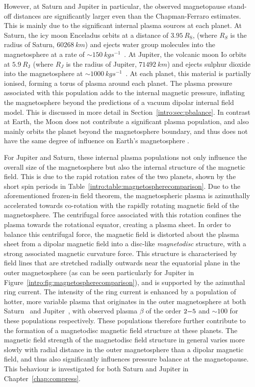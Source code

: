However, at Saturn and Jupiter in particular, the observed magnetopause stand-off distances are significantly larger even than the Chapman-Ferraro estimates. This is mainly due to the significant internal plasma sources at each planet. At Saturn, the icy moon Enceladus orbits at a distance of $\SI{3.95}{R_\mathrm{S}}$, (where $\si{R_S}$ is the radius of Saturn, $\SI{60268}{km}$) and ejects water group molecules into the magnetosphere at a rate of ${\sim}\SI{150}{kg s^{-1}}$~\citep{tokar2006,dougherty2006}. At Jupiter, the volcanic moon Io orbits at $\SI{5.9}{R_\mathrm{J}}$ (where $\si{R_J}$ is the radius of Jupiter, $\SI{71492}{km}$) and ejects sulphur dioxide into the magnetosphere at ${\sim}\SI{1000}{kg s^{-1}}$~\citep{bagenal2011}. At each planet, this material is partially ionised, forming a torus of plasma around each planet. The plasma pressure associated with this population adds to the internal magnetic pressure, inflating the magnetosphere beyond the predictions of a vacuum dipolar internal field model. This is discussed in more detail in Section~\ref{intro:sec:pbalance}. In contrast at Earth, the Moon does not contribute a significant plasma population, and also mainly orbits the planet beyond the magnetosphere boundary, and thus does not have the same degree of influence on Earth's magnetosphere \citep[e.g.][]{schneider1967}.

For Jupiter and Saturn, these internal plasma populations not only influence the overall size of the magnetosphere but also the internal structure of the magnetic field. This is due to the rapid rotation rates of the two planets, shown by the short spin periods in Table~\ref{intro:table:magnetospherecomparison}. Due to the aforementioned frozen-in field theorem, the magnetospheric plasma is azimuthally accelerated towards co-rotation with the rapidly rotating magnetic field of the magnetosphere. The centrifugal force associated with this rotation confines the plasma towards the rotational equator, creating a plasma sheet. In order to balance this centrifugal force, the magnetic field is distorted about the plasma sheet from a dipolar magnetic field into a disc-like \textit{magnetodisc} structure, with a strong associated magnetic curvature force. This structure  is characterised by field lines that are stretched radially outwards near the equatorial plane in the outer magnetosphere (as can be seen particularly for Jupiter in Figure~\ref{intro:fig:magnetospherecomparison}), and is supported by the azimuthal ring current. The intensity of the ring current is enhanced by a population of hotter, more variable plasma that originates in the outer magnetosphere at both Saturn~\citep[e.g.][]{sergis2010} and Jupiter~\citep[e.g.][]{mauk2004}, with observed plasma $\beta$ of the order $2{\--}5$ and ${\sim}100$ for these populations respectively. These populations therefore further contribute to the formation of a magnetodisc magnetic field structure at these planets. The magnetic field strength of the magnetodisc field structure in general varies more slowly with radial distance in the outer magnetosphere than a dipolar magnetic field, and thus also significantly influences pressure balance at the magnetopause. This behaviour is investigated for both Saturn and Jupiter in Chapter~\ref{chap:compress}. 

